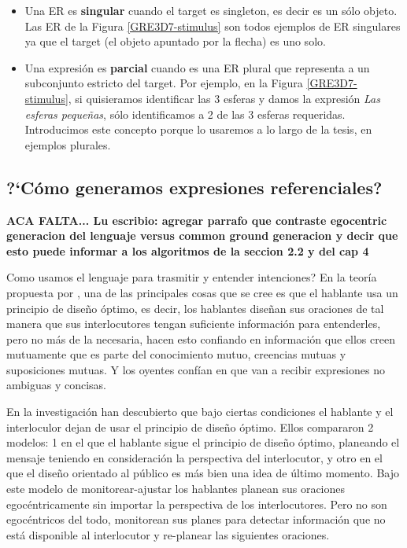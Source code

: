 \begin{itemize}
\item Una ER es {\bf singular} cuando el target es singleton, es decir es un s\'olo objeto. Las ER de la Figura \ref{GRE3D7-stimulus} son todos ejemplos de ER singulares ya que el target (el objeto apuntado por la flecha) es uno solo. 

\item Una expresi\'on es {\bf parcial} cuando es una ER plural que representa a un subconjunto estricto del target. Por ejemplo, en la Figura \ref{GRE3D7-stimulus}, si quisieramos identificar las 3 esferas y damos la expresi\'on {\it Las esferas peque\~nas}, s\'olo identificamos a 2 de las 3 esferas requeridas. Introducimos este concepto porque lo usaremos a lo largo de la tesis, en ejemplos plurales. 
\end{itemize}

\subsection{?`C\'omo generamos expresiones referenciales?}
\label{sec:psicolinguistica}

\textbf{ACA FALTA... Lu escribio: agregar parrafo que contraste egocentric generacion del lenguaje versus common ground generacion y decir que esto puede informar a los algoritmos de la seccion 2.2 y del cap 4}

Como usamos el lenguaje para trasmitir y entender intenciones? En la teor\'ia propuesta por \cite{clark1992arenas}, \cite{Clark-Marshall81} una de las principales cosas que se cree es que el hablante usa un principio de dise\~no \'optimo, es decir, los hablantes dise\~nan sus oraciones de tal manera que sus interlocutores tengan suficiente informaci\'on para entenderles, pero no m\'as de la necesaria, hacen esto confiando en informaci\'on que ellos creen mutuamente que es parte del conocimiento mutuo, creencias mutuas y suposiciones mutuas. Y los oyentes conf\'ian en que van a recibir expresiones no ambiguas y concisas. 

En la investigaci\'on \cite{keysar:Curr98} han descubierto que bajo ciertas condiciones el hablante y el interloculor dejan de usar el principio de dise\~no \'optimo. %
Ellos compararon 2 modelos: 1 en el que el hablante sigue el principio de dise\~no \'optimo, planeando el mensaje teniendo en consideraci\'on la perspectiva del interlocutor, y otro en el que el dise\~no orientado al p\'ublico es m\'as bien una idea de \'ultimo momento. Bajo este modelo de monitorear-ajustar los hablantes planean sus oraciones egoc\'entricamente sin importar la perspectiva de los interlocutores. Pero no son egoc\'entricos del todo, monitorean sus planes para detectar informaci\'on que no est\'a disponible al interlocutor y re-planear las siguientes oraciones.

